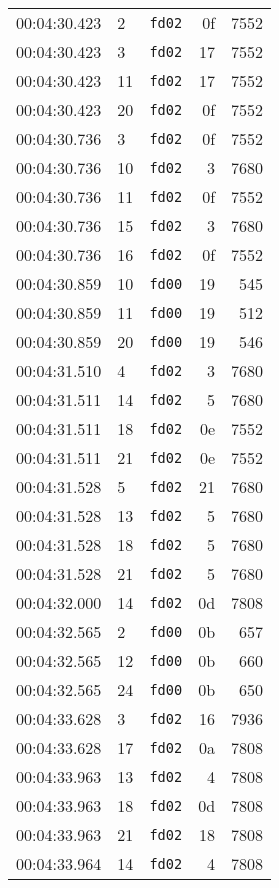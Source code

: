 \documentclass{article}
\begin{document}
\begin{longtable}{lllrr}
00:04:30.423 & 2 & \texttt{fd02} & 0f & 7552 \\
00:04:30.423 & 3 & \texttt{fd02} & 17 & 7552 \\
00:04:30.423 & 11 & \texttt{fd02} & 17 & 7552 \\
00:04:30.423 & 20 & \texttt{fd02} & 0f & 7552 \\
00:04:30.736 & 3 & \texttt{fd02} & 0f & 7552 \\
00:04:30.736 & 10 & \texttt{fd02} & 3 & 7680 \\
00:04:30.736 & 11 & \texttt{fd02} & 0f & 7552 \\
00:04:30.736 & 15 & \texttt{fd02} & 3 & 7680 \\
00:04:30.736 & 16 & \texttt{fd02} & 0f & 7552 \\
00:04:30.859 & 10 & \texttt{fd00} & 19 & 545 \\
00:04:30.859 & 11 & \texttt{fd00} & 19 & 512 \\
00:04:30.859 & 20 & \texttt{fd00} & 19 & 546 \\
00:04:31.510 & 4 & \texttt{fd02} & 3 & 7680 \\
00:04:31.511 & 14 & \texttt{fd02} & 5 & 7680 \\
00:04:31.511 & 18 & \texttt{fd02} & 0e & 7552 \\
00:04:31.511 & 21 & \texttt{fd02} & 0e & 7552 \\
00:04:31.528 & 5 & \texttt{fd02} & 21 & 7680 \\
00:04:31.528 & 13 & \texttt{fd02} & 5 & 7680 \\
00:04:31.528 & 18 & \texttt{fd02} & 5 & 7680 \\
00:04:31.528 & 21 & \texttt{fd02} & 5 & 7680 \\
00:04:32.000 & 14 & \texttt{fd02} & 0d & 7808 \\
00:04:32.565 & 2 & \texttt{fd00} & 0b & 657 \\
00:04:32.565 & 12 & \texttt{fd00} & 0b & 660 \\
00:04:32.565 & 24 & \texttt{fd00} & 0b & 650 \\
00:04:33.628 & 3 & \texttt{fd02} & 16 & 7936 \\
00:04:33.628 & 17 & \texttt{fd02} & 0a & 7808 \\
00:04:33.963 & 13 & \texttt{fd02} & 4 & 7808 \\
00:04:33.963 & 18 & \texttt{fd02} & 0d & 7808 \\
00:04:33.963 & 21 & \texttt{fd02} & 18 & 7808 \\
00:04:33.964 & 14 & \texttt{fd02} & 4 & 7808 \\

\end{longtable}
\end{document}
